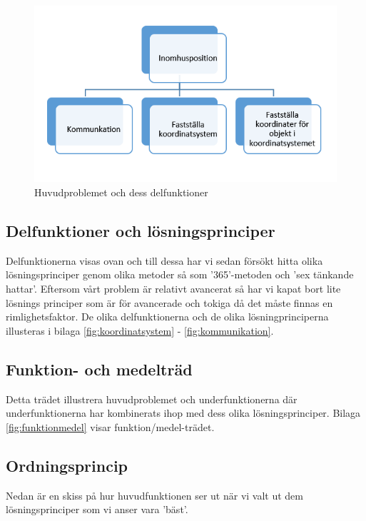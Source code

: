 \documentclass[11pt, a4paper]{report}
\begin{document}
\begin{figure}[H]
	\begin{center}
		\includegraphics [width=12cm,angle=0]{delfunktioner.PNG}
		\caption{Huvudproblemet och dess delfunktioner}
		\label{fig:huvudproblem}
	\end{center}
\end{figure}


\subsection{Delfunktioner och lösningsprinciper}

Delfunktionerna visas ovan och till dessa har vi sedan försökt hitta olika lösningsprinciper genom olika metoder så som '365'-metoden och 'sex tänkande hattar'. Eftersom vårt problem är relativt avancerat så har vi kapat bort lite lösnings principer som är för avancerade och tokiga då det måste finnas en rimlighetsfaktor. De olika delfunktionerna och de olika lösningprinciperna illusteras i bilaga \ref{fig:koordinatsystem} - \ref{fig:kommunikation}.

\subsection{Funktion- och medelträd}

Detta trädet illustrera huvudproblemet och underfunktionerna där underfunktionerna har kombinerats ihop med dess olika lösningsprinciper. Bilaga \ref{fig:funktionmedel} visar funktion/medel-trädet.


\subsection{Ordningsprincip}

Nedan är en skiss på hur huvudfunktionen ser ut när vi valt ut dem lösningsprinciper som vi anser vara 'bäst'. \\
\end{document}
